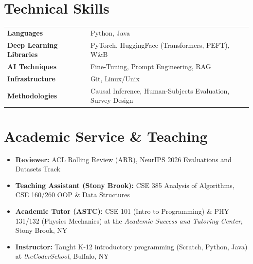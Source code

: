 \documentclass[letterpaper,10pt]{article}
\begin{document}
    \section{Technical Skills}
    \vspace{-2pt}
    \begin{tabular}{@{}p{5cm}l}
        \textbf{Languages} & Python, Java \\
        \textbf{Deep Learning Libraries} & PyTorch, HuggingFace (Transformers, PEFT), W\&B \\
        \textbf{AI Techniques} & Fine-Tuning, Prompt Engineering, RAG \\
        \textbf{Infrastructure} & Git, Linux/Unix \\
        \textbf{Methodologies} & Causal Inference, Human-Subjects Evaluation, Survey Design \\
    \end{tabular}
    \vspace{8pt}

    \section{Academic Service \& Teaching}
    \vspace{-2pt}
    \begin{itemize}[leftmargin=0.6cm]
        \setlength\itemsep{2pt}
        \item \textbf{Reviewer:} ACL Rolling Review (ARR), NeurIPS 2026 Evaluations and Datasets Track
        \item \textbf{Teaching Assistant (Stony Brook):} CSE 385 Analysis of Algorithms, CSE 160/260 OOP \& Data Structures
        \item \textbf{Academic Tutor (ASTC):} CSE 101 (Intro to Programming) \& PHY 131/132 (Physics Mechanics) at the \emph{Academic Success and Tutoring Center}, Stony Brook, NY
        \item \textbf{Instructor:} Taught K-12 introductory programming (Scratch, Python, Java) at \emph{theCoderSchool}, Buffalo, NY
    \end{itemize}
\end{document}
